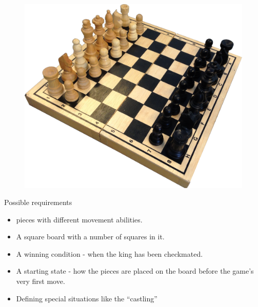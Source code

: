 \begin{figure}
	\centering
		\includegraphics[scale=0.1]{pictures/chess.png}
\label{fig:chess}
\end{figure}

Possible requirements
\begin{itemize}[noitemsep]
\item pieces with different movement abilities.
\item A square board with a number of squares in it.
\item A winning condition - when the king has been checkmated.
\item A starting state - how the pieces are placed on the board before the game's very first move.
\item Defining special situations like the ``castling''
\end{itemize}